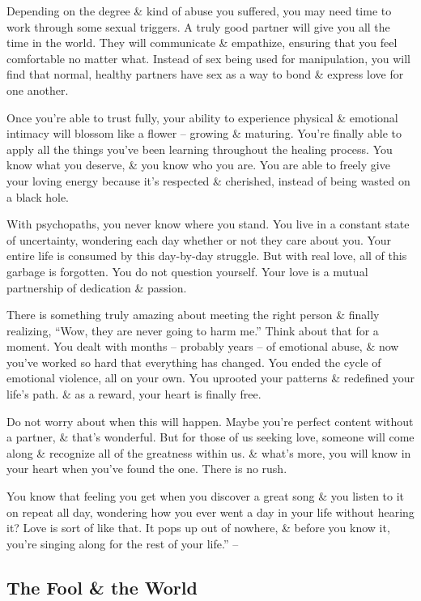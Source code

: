 \documentclass{article}
\numberwithin{equation}{section}
\begin{document}
Depending on the degree \& kind of abuse you suffered, you may need time to work through some sexual triggers. A truly good partner will give you all the time in the world. They will communicate \& empathize, ensuring that you feel comfortable no matter what. Instead of sex being used for manipulation, you will find that normal, healthy partners have sex as a way to bond \& express love for one another.

Once you're able to trust fully, your ability to experience physical \& emotional intimacy will blossom like a flower -- growing \& maturing. You're finally able to apply all the things you've been learning throughout the healing process. You know what you deserve, \& you know who you are. You are able to freely give your loving energy because it's respected \& cherished, instead of being wasted on a black hole.

With psychopaths, you never know where you stand. You live in a constant state of uncertainty, wondering each day whether or not they care about you. Your entire life is consumed by this day-by-day struggle. But with real love, all of this garbage is forgotten. You do not question yourself. Your love is a mutual partnership of dedication \& passion.

There is something truly amazing about meeting the right person \& finally realizing, ``Wow, they are never going to harm me.'' Think about that for a moment. You dealt with months -- probably years -- of emotional abuse, \& now you've worked so hard that everything has changed. You ended the cycle of emotional violence, all on your own. You uprooted your patterns \& redefined your life's path. \& as a reward, your heart is finally free.

Do not worry about when this will happen. Maybe you're perfect content without a partner, \& that's wonderful. But for those of us seeking love, someone will come along \& recognize all of the greatness within us. \& what's more, you will know in your heart when you've found the one. There is no rush.

You know that feeling you get when you discover a great song \& you listen to it on repeat all day, wondering how you ever went a day in your life without hearing it? Love is sort of like that. It pops up out of nowhere, \& before you know it, you're singing along for the rest of your life.'' -- \cite[pp. 183--184]{MacKenzie2015}

\subsection{The Fool \& the World}
\end{document}
